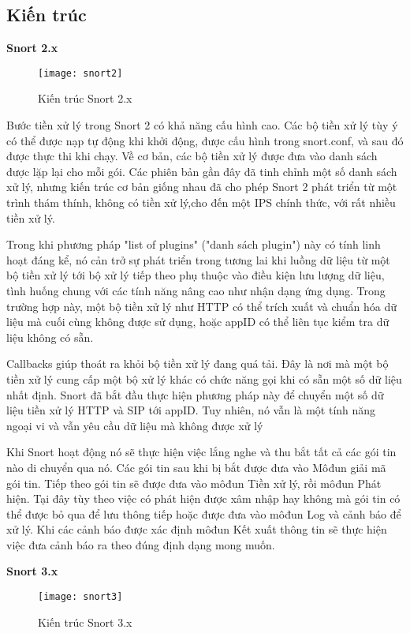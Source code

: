 \subsection{Kiến trúc}
\textbf{Snort 2.x}
\begin{figure}[!htbp]
    \centering
    \texttt{[image: snort2]}
    \caption{Kiến trúc Snort 2.x}
    \label{fig:x cubed graph}
\end{figure}
\FloatBarrier
Bước tiền xử lý trong Snort 2 có khả năng cấu hình cao. Các bộ tiền xử lý tùy ý có thể được nạp tự động khi khởi động, được cấu hình trong snort.conf, và sau đó được thực thi khi chạy.
Về cơ bản, các bộ tiền xử lý được đưa vào danh sách được lặp lại cho mỗi gói. 
Các phiên bản gần đây đã tinh chỉnh một số danh sách xử lý, nhưng kiến trúc cơ bản giống nhau đã cho phép Snort 2 phát triển từ một trình thám thính, không có tiền xử lý,cho đến một IPS chính thức, với rất nhiều tiền xử lý.
\par
Trong khi phương pháp "list of plugins" ("danh sách plugin") này có tính linh hoạt đáng kể, nó cản trở sự phát triển trong tương lai khi luồng dữ liệu từ một bộ tiền xử lý tới bộ xử lý tiếp theo phụ thuộc vào điều kiện lưu lượng dữ liệu, tình huống chung với các tính năng nâng cao như nhận dạng ứng dụng. 
Trong trường hợp này, một bộ tiền xử lý như HTTP có thể trích xuất và chuẩn hóa dữ liệu mà cuối cùng không được sử dụng, hoặc appID có thể liên tục kiểm tra dữ liệu không có sẵn.
\par
Callbacks giúp thoát ra khỏi bộ tiền xử lý đang quá tải. Đây là nơi mà một bộ tiền xử lý cung cấp một bộ xử lý khác có chức năng gọi khi có sẵn một số dữ liệu nhất định. 
Snort đã bắt đầu thực hiện phương pháp này để chuyển một số dữ liệu tiền xử lý HTTP và SIP tới appID. 
Tuy nhiên, nó vẫn là một tính năng ngoại vi và vẫn yêu cầu dữ liệu mà không được xử lý
\par
Khi Snort hoạt động nó sẽ thực hiện việc lắng nghe và thu bắt tất cả các gói tin nào di chuyển qua nó. Các gói tin sau khi bị bắt được đưa vào Môđun giải mã gói tin. 
Tiếp theo gói tin sẽ được đưa vào môđun Tiền xử lý, rồi môđun Phát hiện. 
Tại đây tùy theo việc có phát hiện được xâm nhập hay không mà gói tin có thể được bỏ qua để lưu thông tiếp hoặc được đưa vào môđun Log và cảnh báo để xử lý. Khi các cảnh báo được xác định môđun Kết xuất thông tin sẽ thực hiện việc đưa cảnh báo ra theo đúng định dạng mong muốn.
\newline
\par
\textbf{Snort 3.x}
\begin{figure}[!htbp]
    \centering
    \texttt{[image: snort3]}
    \caption{Kiến trúc Snort 3.x}
    \label{fig:x cubed graph}
\end{figure}
